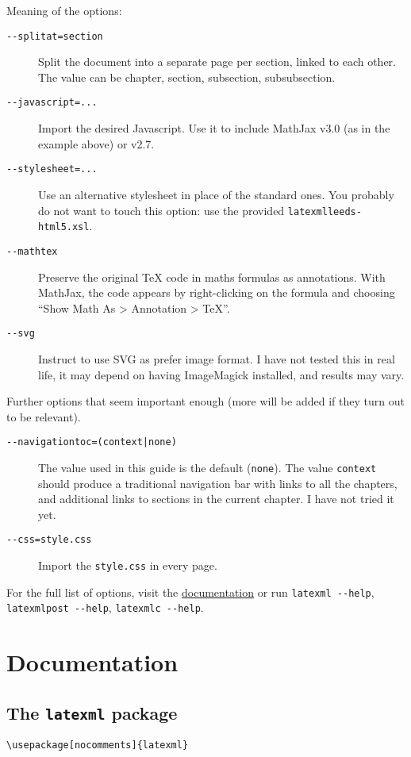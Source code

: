 \documentclass[a4paper]{article}
\theoremstyle{definition}
\begin{document}
Meaning of the options:
\begin{description}
  \item[\texttt{{-}{-}splitat=section}] Split the document into a separate \HTML{} page per section, linked to each other. The value can be chapter, section, subsection, subsubsection.
  \item[\texttt{{-}{-}javascript=...}] Import the desired Javascript. Use it to include MathJax v3.0 (as in the example above) or v2.7.
  \item[\texttt{{-}{-}stylesheet=...}] Use an alternative \XSLT{} stylesheet in place of the standard ones. You probably do not want to touch this option: use the provided \verb|latexmlleeds-html5.xsl|.
  \item[\texttt{{-}{-}mathtex}] Preserve the original \TeX{} code in maths formulas as annotations. With MathJax, the code appears by right-clicking on the formula and choosing ``Show Math As > Annotation > TeX''.
  \item[\texttt{{-}{-}svg}] Instruct \LaTeXML{} to use SVG as prefer image format. I have not tested this in real life, it may depend on having ImageMagick installed, and results may vary.
\end{description}
Further options that seem important enough (more will be added if they turn out to be relevant).
\begin{description}
  \item[\texttt{{-}{-}navigationtoc=(context|none)}] The value used in this guide is the default (\verb|none|). The value \verb|context| should produce a traditional navigation bar with links to all the chapters, and additional links to sections in the current chapter. I have not tried it yet.
  \item[\texttt{{-}{-}css=style.css}] Import the \CSS{} \verb|style.css| in every page.
\end{description}
For the full list of options, visit the \href{https://dlmf.nist.gov/LaTeXML/docs.html}{\LaTeXML{} documentation} or run \verb|latexml --help|, \verb|latexmlpost --help|, \verb|latexmlc --help|.


\section{Documentation}

\subsection{The \texttt{latexml} package}
\begin{lstlisting}[style=latexml,caption={Import \texttt{latexml} in the preamble}]
  \usepackage[nocomments]{latexml}
\end{lstlisting}
\end{document}
